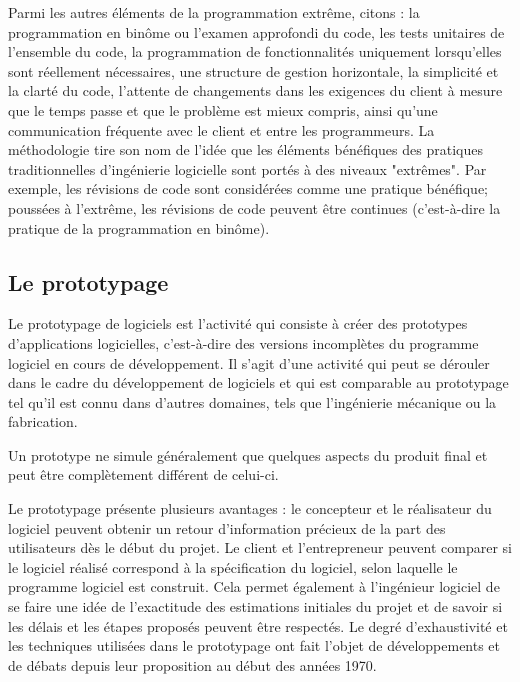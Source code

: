 \begin{enumerate}
    Parmi les autres éléments de la programmation extrême, citons : la programmation en binôme ou
    l'examen approfondi du code, les tests unitaires de l'ensemble du code, la programmation de
    fonctionnalités uniquement lorsqu'elles sont réellement nécessaires, une structure de gestion
    horizontale, la simplicité et la clarté du code, l'attente de changements dans les exigences du
    client à mesure que le temps passe et que le problème est mieux compris, ainsi qu'une communication
    fréquente avec le client et entre les programmeurs. La méthodologie tire son nom de l'idée que les
    éléments bénéfiques des pratiques traditionnelles d'ingénierie logicielle sont portés à des niveaux
    "extrêmes". Par exemple, les révisions de code sont considérées comme une pratique bénéfique;
    poussées à l'extrême, les révisions de code peuvent être continues (c'est-à-dire la pratique de la programmation en binôme).
\end{enumerate}

\subsection{Le prototypage}\label{subsec:prototypage}
Le prototypage\cite{software_prototyping} de logiciels est l'activité qui consiste à créer des prototypes
d'applications logicielles, c'est-à-dire des versions incomplètes du programme
logiciel en cours de développement. Il s'agit d'une activité qui peut se dérouler
dans le cadre du développement de logiciels et qui est comparable au prototypage
tel qu'il est connu dans d'autres domaines, tels que l'ingénierie mécanique ou la fabrication.

Un prototype ne simule généralement que quelques aspects du produit final et peut être
complètement différent de celui-ci.

Le prototypage présente plusieurs avantages : le concepteur et le réalisateur du
logiciel peuvent obtenir un retour d'information précieux de la part des utilisateurs
dès le début du projet. Le client et l'entrepreneur peuvent comparer si le logiciel
réalisé correspond à la spécification du logiciel, selon laquelle le programme
logiciel est construit. Cela permet également à l'ingénieur logiciel de se faire
une idée de l'exactitude des estimations initiales du projet et de savoir si les délais
et les étapes proposés peuvent être respectés. Le degré d'exhaustivité et les techniques
utilisées dans le prototypage ont fait l'objet de développements et de débats depuis leur
proposition au début des années 1970.

